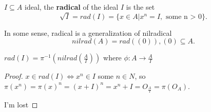 \documentclass[a4paper]{article}
\begin{document}
\begin{definition}
  $I \subseteq A$ ideal, the \textbf{radical} of the ideal $I$ is the set 
   \[
     \sqrt{I} = rad(I) = \{x \in A | x^n = I, \text{ some n > 0}\}  
  .\] 
\end{definition}

\begin{remark} In some sense, radical is a generalization of nilradical
   \[
  nilrad(A) = rad((0)), (0) \subseteq A
  .\] 
\end{remark}

\begin{prop}
  $rad(I) = \pi^{-1} (nilrad(\frac{A}{I}))$ where $\phi: A \to \frac{A}{I}$ 
  
  \begin{proof}
    $x \in rad(I) \iff x^{n} \in I$ some $n \in N$, so  $\pi(x^{n}) = \pi(x)^{n} = (x+I)^{n} = x^{n} + I = 
    O_{\frac{A}{I}} = \pi(O_A)$.

    I'm lost
  \end{proof}
\end{prop}
\end{document}
